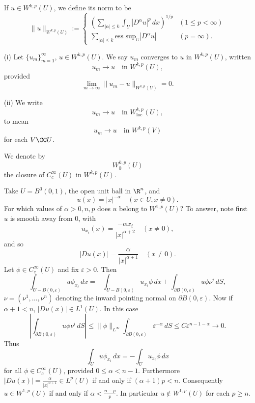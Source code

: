 \begin{definition}[Norm on $W^{k,p}(U)$]
\label{def:sobolev-norm}
If $u \in W^{k,p}(U)$, we define its norm to be
$$\|u\|_{W^{k,p}(U)} := \begin{cases}
\left(\sum_{|\alpha| \le k} \int_U |D^\alpha u|^p\,dx\right)^{1/p} & (1 \le p < \infty) \\
\sum_{|\alpha| \le k} \text{ess sup}_U |D^\alpha u| & (p = \infty).
\end{cases}$$
\end{definition}

\begin{definition}
\label{def:sobolev-convergence}
(i) Let $\{u_m\}_{m=1}^\infty$, $u \in W^{k,p}(U)$. We say $u_m$ converges to $u$ in $W^{k,p}(U)$, written
$$u_m \to u \quad \text{in } W^{k,p}(U),$$
provided
$$\lim_{m \to \infty} \|u_m - u\|_{W^{k,p}(U)} = 0.$$

(ii) We write
$$u_m \to u \quad \text{in } W^{k,p}_{\text{loc}}(U),$$
to mean
$$u_m \to u \quad \text{in } W^{k,p}(V)$$
for each $V \CC U$.
\end{definition}

\begin{definition}
\label{def:sobolev-space-zero-boundary}
We denote by
$$W_0^{k,p}(U)$$
the closure of $C_c^\infty(U)$ in $W^{k,p}(U)$.
\end{definition}

\begin{example}
\label{ex:power-singularity-sobolev-membership}
Take $U = B^0(0,1)$, the open unit ball in $\R^n$, and
$$u(x) = |x|^{-\alpha} \quad (x \in U, x \ne 0).$$
For which values of $\alpha > 0, n, p$ does $u$ belong to $W^{1,p}(U)$? To answer, note first $u$ is smooth away from $0$, with
$$u_{x_i}(x) = \frac{-\alpha x_i}{|x|^{\alpha+2}} \quad (x \ne 0),$$
and so
$$|Du(x)| = \frac{\alpha}{|x|^{\alpha+1}} \quad (x \ne 0).$$
Let $\phi \in C_c^\infty(U)$ and fix $\varepsilon > 0$. Then
$$\int_{U - B(0,\varepsilon)} u\phi_{x_i}\,dx = -\int_{U - B(0,\varepsilon)} u_{x_i}\phi\,dx + \int_{\partial B(0,\varepsilon)} u\phi\nu^i\,dS,$$
$\nu = (\nu^1, \ldots, \nu^n)$ denoting the inward pointing normal on $\partial B(0,\varepsilon)$. Now if $\alpha + 1 < n$, $|Du(x)| \in L^1(U)$. In this case
$$\left|\int_{\partial B(0,\varepsilon)} u\phi\nu^i\,dS\right| \le \|\phi\|_{L^\infty} \int_{\partial B(0,\varepsilon)} \varepsilon^{-\alpha}\,dS \le C\varepsilon^{n-1-\alpha} \to 0.$$
Thus
$$\int_U u\phi_{x_i}\,dx = -\int_U u_{x_i}\phi\,dx$$
for all $\phi \in C_c^\infty(U)$, provided $0 \le \alpha < n - 1$. Furthermore $|Du(x)| = \frac{\alpha}{|x|^{\alpha+1}} \in L^p(U)$ if and only if $(\alpha+1)p < n$. Consequently $u \in W^{1,p}(U)$ if and only if $\alpha < \frac{n-p}{p}$. In particular $u \notin W^{1,p}(U)$ for each $p \ge n$.
\end{example}

